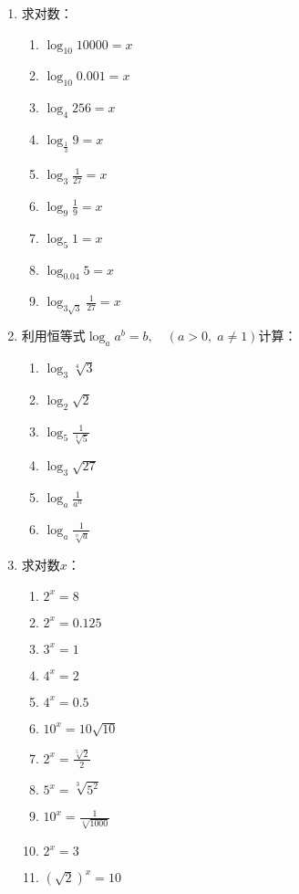 \begin{ex}
\begin{enumerate}
\item 求对数：
\begin{multicols}{3}
\begin{enumerate}
    \item $\log_{10} 10000=x$
    \item $\log_{10} 0.001=x$
    \item $\log_4 256=x$
    \item $\log_{\tfrac{1}{3}} 9=x$
    \item $\log_3 \frac{1}{27}=x$
    \item $\log_9\frac{1}{9}=x$
    \item $\log_5 1=x$
    \item $\log_{0.04} 5=x$
    \item $\log_{3\sqrt{3}}\frac{1}{27}=x$
\end{enumerate}
\end{multicols} 

\item 利用恒等式$\log_a a^b=b,\quad (a>0,\; a\ne 1)$计算：
\begin{multicols}{3}
    \begin{enumerate}
        \item $\log_3\sqrt[4]{3}$
        \item $\log_2\sqrt{2}$
        \item $\log_5\frac{1}{\sqrt[3]{5}}$
        \item $\log_3\sqrt{27}$
        \item $\log_a\frac{1}{a^n}$
        \item $\log_a \frac{1}{\sqrt[n]{a}}$
    \end{enumerate}
    \end{multicols} 

\item 求对数$x$：
\begin{multicols}{3}
    \begin{enumerate}
        \item $2^x=8$
        \item $2^x=0.125$
        \item $3^x=1$
        \item $4^x=2$
        \item $4^x=0.5$
        \item $10^x=10\sqrt{10}$
        \item $2^x=\frac{\sqrt[5]{2}}{2}$
        \item $5^x=\sqrt[3]{5^2}$
        \item $10^x=\frac{1}{\sqrt[4]{1000}}$
        \item $2^x=3$
        \item $\left(\sqrt{2}\right)^x=10$
    \end{enumerate}
    \end{multicols} 


\end{enumerate}
\end{ex}
